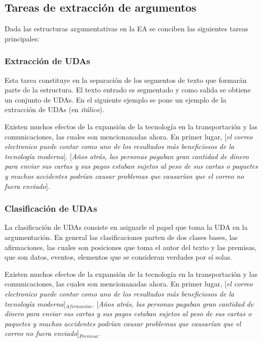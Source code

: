 \subsection{Tareas de extracción de argumentos}

Dada las estructuras argumentativas en la EA se conciben las siguientes tareas principales:

\subsubsection{Extracción de UDAs}

Esta tarea constituye en la separación de los segmentos de texto que formarán parte de la estructura.
El texto entrado es segmentado y como salida se obtiene un conjunto de UDAs. En el siguiente ejemplo se 
pone un ejemplo de la extracción de UDAs (en \emph{itálico}).

\begin{adjustwidth}{25pt}{25pt}
    Existen muchos efectos de la expansión de la tecnología en la transportación y las comunicaciones,
    las cuales son mencionanadas ahora. En primer lugar, [\emph{el correo electronico puede contar como uno de los resultados
    más beneficiosos de la tecnología moderna}]. [\emph{Años atrás, las personas pagaban gran cantidad de dinero para 
    enviar sus cartas y sus pagos estaban sujetos al peso de sus cartas o paquetes y muchos accidentes podrían 
    causar problemas que causarían que el correo no fuera enviado}].
\end{adjustwidth}

\subsubsection{Clasificación de UDAs}

La clasificación de UDAs consiste en asignarle el papel que toma la UDA en la argumentación. En general 
las clasificaciones parten de dos clases bases, las afirmaciones, las cuales son posiciones que toma el 
autor del texto y las premisas, que son datos, eventos, elementos que se consideran verdades por sí solas.  

\begin{adjustwidth}{25pt}{25pt}
    Existen muchos efectos de la expansión de la tecnología en la transportación y las comunicaciones, 
    las cuales son mencionanadas ahora. En primer lugar, [\emph{el correo electronico puede contar como uno de los resultados
    más beneficiosos de la tecnología moderna}]$_{Afirmación}$. [\emph{Años atrás, las personas pagaban gran cantidad de dinero para 
    enviar sus cartas y sus pagos estaban sujetos al peso de sus cartas o paquetes y muchos accidentes podrían 
    causar problemas que causarían que el correo no fuera enviado}]$_{Premisa}$.
\end{adjustwidth}

